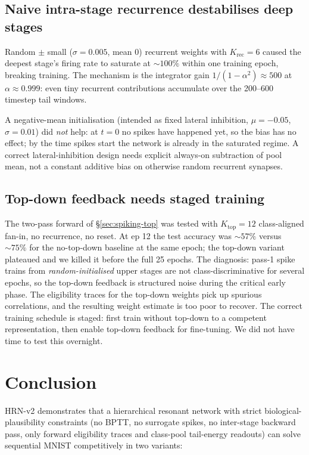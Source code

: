 \documentclass[11pt]{article}
\begin{document}
\subsection{Naive intra-stage recurrence destabilises deep stages}

Random $\pm$ small ($\sigma = 0.005$, mean 0) recurrent weights with
$K_{\text{rec}} = 6$ caused the deepest stage's firing rate to
saturate at $\sim 100\%$ within one training epoch, breaking
training. The mechanism is the integrator gain
$1/(1-\alpha^2) \approx 500$ at $\alpha \approx 0.999$: even tiny
recurrent contributions accumulate over the 200--600 timestep tail
windows.

A negative-mean initialisation (intended as fixed lateral inhibition,
$\mu = -0.05$, $\sigma = 0.01$) did \emph{not} help: at $t = 0$ no
spikes have happened yet, so the bias has no effect; by the time
spikes start the network is already in the saturated regime.
A correct lateral-inhibition design needs explicit always-on
subtraction of pool mean, not a constant additive bias on otherwise
random recurrent synapses.

\subsection{Top-down feedback needs staged training}

The two-pass forward of \S\ref{sec:spiking-top} was tested with
$K_{\text{top}} = 12$ class-aligned fan-in, no recurrence, no
reset. At ep 12 the test accuracy was $\sim 57\%$ versus $\sim 75\%$
for the no-top-down baseline at the same epoch; the top-down
variant plateaued and we killed it before the full 25 epochs. The
diagnosis: pass-1 spike trains from \emph{random-initialised} upper
stages are not class-discriminative for several epochs, so the
top-down feedback is structured noise during the critical early
phase. The eligibility traces for the top-down weights pick up
spurious correlations, and the resulting weight estimate is too
poor to recover. The correct training schedule is staged: first
train without top-down to a competent representation, then enable
top-down feedback for fine-tuning. We did not have time to test
this overnight.

\section{Conclusion}

HRN-v2 demonstrates that a hierarchical resonant network with strict
biological-plausibility constraints (no BPTT, no surrogate spikes,
no inter-stage backward pass, only forward eligibility traces and
class-pool tail-energy readouts) can solve sequential MNIST
competitively in two variants:
\end{document}
